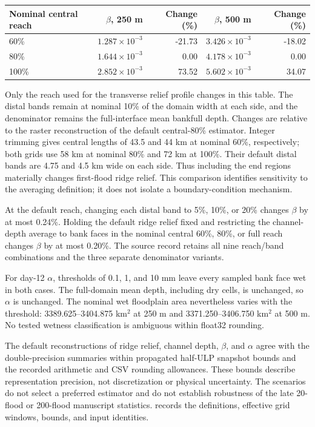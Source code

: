 \begin{center}\small
\begin{tabular}{lrrrr}
\toprule
Nominal central reach & $\beta$, 250 m & Change (\%) & $\beta$, 500 m & Change (\%) \\
\midrule
60\% & $1.287\times10^{-3}$ & -21.73 & $3.426\times10^{-3}$ & -18.02 \\
80\% & $1.644\times10^{-3}$ & 0.00 & $4.178\times10^{-3}$ & 0.00 \\
100\% & $2.852\times10^{-3}$ & 73.52 & $5.602\times10^{-3}$ & 34.07 \\
\bottomrule\end{tabular}\end{center}
Only the reach used for the transverse relief profile changes in this
table. The distal bands remain at nominal 10\% of the domain width at each side,
and the denominator remains the full-interface mean bankfull depth.
Changes are relative to the raster reconstruction of the default
central-80\% estimator. Integer trimming gives central lengths of
43.5 and 44 km at nominal 60\%, respectively; both grids use 58 km
at nominal 80\% and 72 km at 100\%. Their default distal bands are
4.75 and 4.5 km wide on each side.
Thus including the end regions materially changes first-flood ridge
relief. This comparison identifies sensitivity to the averaging
definition; it does not isolate a boundary-condition mechanism.

At the default reach, changing each distal band to 5\%, 10\%, or 20\%
changes $\beta$ by at most 0.24\%.
Holding the default ridge relief fixed and restricting the channel-depth
average to bank faces in the nominal central 60\%, 80\%, or full reach
changes $\beta$ by at most 0.20\%.
The source record retains all nine reach/band combinations and the
three separate denominator variants.

For day-12 $\alpha$, thresholds of 0.1, 1, and 10 mm leave every
sampled bank face wet in both cases. The full-domain mean depth,
including dry cells, is unchanged, so $\alpha$ is unchanged.
The nominal wet floodplain area nevertheless varies with the threshold:
3389.625--3404.875 km$^2$ at 250 m and 3371.250--3406.750 km$^2$ at 500 m.
No tested wetness classification is ambiguous within float32 rounding.

The default reconstructions of ridge relief, channel depth,
$\beta$, and $\alpha$ agree with the double-precision summaries
within propagated half-ULP snapshot bounds and the recorded arithmetic
and CSV rounding allowances. These bounds describe representation
precision, not discretization or physical uncertainty. The scenarios
do not select a preferred estimator and do not establish robustness
of the late 20-flood or 200-flood manuscript statistics.
 records the
definitions, effective grid windows, bounds, and input identities.

